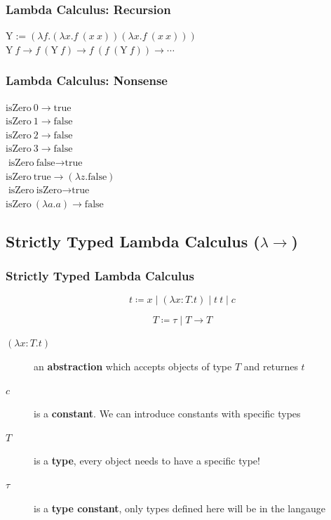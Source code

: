 \documentclass{beamer}
\newcommand{\true}{\text{true}}
\newcommand{\false}{\text{false}}
\begin{document}
\begin{frame}[fragile]
  \frametitle{Lambda Calculus: Recursion}

  $ \text{Y} := (\lambda f. (\lambda x. f\ (x\ x)) (\lambda x. f\ (x\ x))) $ \\
  $ \text{Y}\ f \rightarrow f\ (\text{Y}\ f) \rightarrow f\ (f\ (\text{Y}\ f)) \rightarrow \cdots$
\end{frame}

\begin{frame}[fragile]
  \frametitle{Lambda Calculus: Nonsense}

  $ \text{isZero}\ 0 \rightarrow \true $ \\
  $ \text{isZero}\ 1 \rightarrow \false $ \\
  $ \text{isZero}\ 2 \rightarrow \false $ \\
  $ \text{isZero}\ 3 \rightarrow \false $ \\
  $ \text{isZero}\ \false \rightarrow \true $ \\
  $ \text{isZero}\ \true \rightarrow (\lambda z. \false) $ \\
  $ \text{isZero}\ \text{isZero} \rightarrow \true $ \\
  $ \text{isZero}\ (\lambda a . a) \rightarrow \false $ \\
\end{frame}

\subsection{Strictly Typed Lambda Calculus ($\lambda \rightarrow$)}

\begin{frame}[fragile]
  \frametitle{Strictly Typed Lambda Calculus}

  $$ t \coloneqq x  \mid  (\lambda x : T . t)  \mid   t\  t \mid c $$

  $$ T \coloneqq \tau \mid T \rightarrow T $$

  \begin{description}
    \item[$(\lambda x : T . t)$] an \textbf{abstraction} which accepts objects of type $T$ and returnes $t$
    \item[$c$] is a \textbf{constant}. We can introduce constants with specific types
    \item[$T$] is a \textbf{type}, every object needs to have a specific type!
    \item[$\tau$] is a \textbf{type constant}, only types defined here will be in the langauge
  \end{description}
\end{frame}
\end{document}
